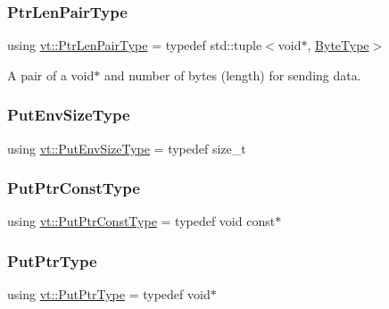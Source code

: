 \subsubsection{\texorpdfstring{Ptr\+Len\+Pair\+Type}{PtrLenPairType}}
{\footnotesize\ttfamily using \hyperlink{namespacevt_a97f320a1d3b9b4035e591671cd7d10f0}{vt\+::\+Ptr\+Len\+Pair\+Type} = typedef std\+::tuple$<$void$\ast$, \hyperlink{namespacevt_aab8d55968084610ce3b17057981e9300}{Byte\+Type}$>$}



A pair of a void$\ast$ and number of bytes (length) for sending data. 

\mbox{\label{namespacevt_aa241444e21c15238e185923792814fe4}} 
\subsubsection{\texorpdfstring{Put\+Env\+Size\+Type}{PutEnvSizeType}}
{\footnotesize\ttfamily using \hyperlink{namespacevt_aa241444e21c15238e185923792814fe4}{vt\+::\+Put\+Env\+Size\+Type} = typedef size\+\_\+t}

\mbox{\label{namespacevt_a494d6c6dc5cdb9a8d61eaedfa2c4d4f3}} 
\subsubsection{\texorpdfstring{Put\+Ptr\+Const\+Type}{PutPtrConstType}}
{\footnotesize\ttfamily using \hyperlink{namespacevt_a494d6c6dc5cdb9a8d61eaedfa2c4d4f3}{vt\+::\+Put\+Ptr\+Const\+Type} = typedef void const$\ast$}

\mbox{\label{namespacevt_a537693bfe0223c71eb52bdbd6ea2c741}} 
\subsubsection{\texorpdfstring{Put\+Ptr\+Type}{PutPtrType}}
{\footnotesize\ttfamily using \hyperlink{namespacevt_a537693bfe0223c71eb52bdbd6ea2c741}{vt\+::\+Put\+Ptr\+Type} = typedef void$\ast$}

\mbox{\label{namespacevt_a4e561211bbf1d8d9a4766eb159852736}} 
